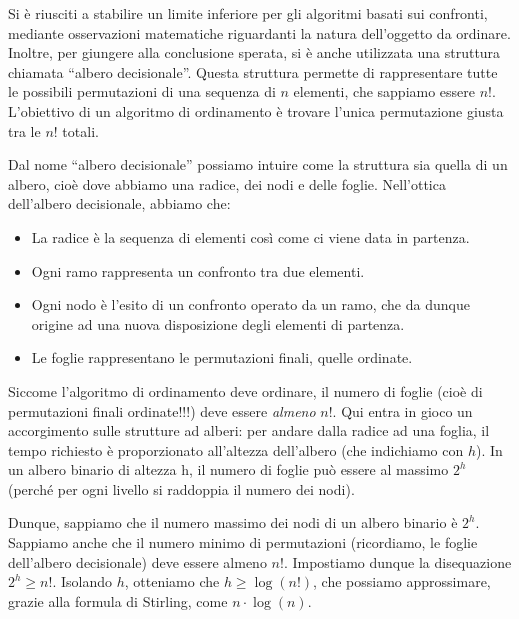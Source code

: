 \documentclass[12pt]{report}
\begin{document}
    Si è riusciti a stabilire un limite inferiore per gli algoritmi basati sui confronti, mediante osservazioni matematiche riguardanti la natura dell’oggetto da ordinare. Inoltre, per giungere alla conclusione sperata, si è anche utilizzata una struttura chiamata “albero decisionale”.
    Questa struttura permette di rappresentare tutte le possibili permutazioni di una sequenza di $n$ elementi, che sappiamo essere $n!$. L’obiettivo di un algoritmo di ordinamento è trovare l’unica permutazione giusta tra le $n!$ totali.
    
    Dal nome “albero decisionale” possiamo intuire come la struttura sia quella di un albero, cioè dove abbiamo una radice, dei nodi e delle foglie. Nell’ottica dell’albero decisionale, abbiamo che:
    \begin{itemize}
    	
    	\item La radice è la sequenza di elementi così come ci viene data in partenza.
    	
    	\item Ogni ramo rappresenta un confronto tra due elementi.
    	
    	\item Ogni nodo è l’esito di un confronto operato da un ramo, che da dunque origine ad una nuova disposizione degli elementi di partenza.
    	
    	\item Le foglie rappresentano le permutazioni finali, quelle ordinate.
    	
    \end{itemize}
    
    Siccome l’algoritmo di ordinamento deve ordinare, il numero di foglie (cioè di permutazioni finali ordinate!!!) deve essere \textit{almeno} $n!$.
    Qui entra in gioco un accorgimento sulle strutture ad alberi: per andare dalla radice ad una foglia, il tempo richiesto è proporzionato all’altezza dell’albero (che indichiamo con $h$).
    In un albero binario di altezza h, il numero di foglie può essere al massimo $2^h$ (perché per ogni livello si raddoppia il numero dei nodi).
    
    Dunque, sappiamo che il numero massimo dei nodi di un albero binario è $2^h$. Sappiamo anche che il numero minimo di permutazioni (ricordiamo, le foglie dell’albero decisionale) deve essere almeno $n!$.
    Impostiamo dunque la disequazione $2^h \geq n!$. Isolando $h$, otteniamo che $h \geq \log(n!)$, che possiamo approssimare, grazie alla formula di Stirling, come $n\cdot \log(n)$.
    
\end{document}

